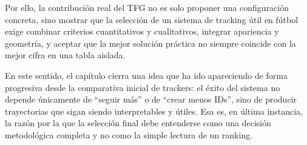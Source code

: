\documentclass[../MAIN.tex]{subfiles}
\begin{document}
	Por ello, la contribución real del TFG no es solo proponer una configuración concreta, sino mostrar que la selección de un sistema de tracking útil en fútbol exige combinar criterios cuantitativos y cualitativos, integrar apariencia y geometría, y aceptar que la mejor solución práctica no siempre coincide con la mejor cifra en una tabla aislada.
	
	En este sentido, el capítulo cierra una idea que ha ido apareciendo de forma progresiva desde la comparativa inicial de trackers: el éxito del sistema no depende únicamente de “seguir más” o de “crear menos IDs”, sino de producir trayectorias que sigan siendo interpretables y útiles. Esa es, en última instancia, la razón por la que la selección final debe entenderse como una decisión metodológica completa y no como la simple lectura de un ranking.
	
	\newpage
	
\end{document}
